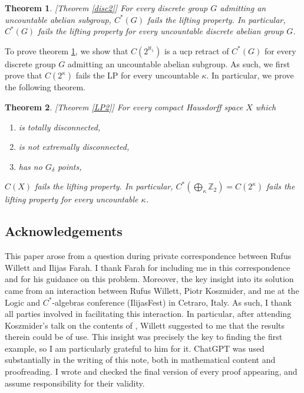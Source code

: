 \documentclass[10pt]{amsart}
\newtheorem{introthm}{Theorem}
\theoremstyle{definition}
\begin{document}
\begin{introthm}\label{disc}[Theorem \ref{disc2}]
    For every discrete group $G$ admitting an uncountable abelian subgroup, $C^*(G)$ fails the lifting property. In particular, $C^*(G)$ fails the lifting property for every uncountable discrete abelian group $G$.
\end{introthm}

To prove theorem \ref{disc}, we show that $C(2^{\aleph_1})$ is a ucp retract of $C^*(G)$ for every discrete group $G$ admitting an uncountable abelian subgroup. As such, we first prove that $C(2^\kappa)$ fails the LP for every uncountable $\kappa$. In particular, we prove the following theorem.

\begin{introthm}\label{LP}[Theorem \ref{LP2}]
    For every compact Hausdorff space $X$ which
    \begin{enumerate}
        \item is totally disconnected,
        \item is not extremally disconnected,
        \item has no $G_\delta$ points,
    \end{enumerate}
    $C(X)$ fails the lifting property. In particular, $C^*(\bigoplus_\mathfrak{\kappa}\mathbb{Z}_2)=C(2^\kappa)$ fails the lifting property for every uncountable $\kappa$.
\end{introthm}



\subsection{Acknowledgements}

This paper arose from a question during private correspondence between Rufus Willett and Ilijas Farah. I thank Farah for including me in this correspondence and for his guidance on this problem. Moreover, the key insight into its solution came from an interaction between Rufus Willett, Piotr Koszmider, and me at the Logic and $C^*$-algebras conference (IlijasFest) in Cetraro, Italy. As such, I thank all parties involved in facilitating this interaction. In particular, after attending Koszmider's talk on the contents of \cite{KOS}, Willett suggested to me that the results therein could be of use. This insight was precisely the key to finding the first example, so I am particularly grateful to him for it. ChatGPT was used substantially in the writing of this note, both in mathematical content and proofreading. I wrote and checked the final version of every proof appearing, and assume responsibility for their validity.
\end{document}
